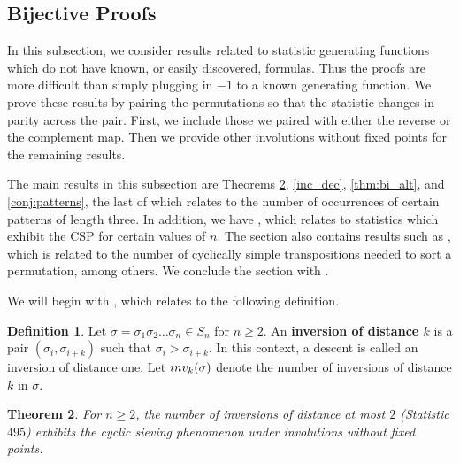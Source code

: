 \documentclass{amsart}
\newtheorem{thm}{Theorem}[section]
\theoremstyle{definition}
\newtheorem{definition}[thm]{Definition}
\newcommand{\inv}{\textnormal{inv}}
\begin{document}
\subsection{Bijective Proofs}
In this subsection, we consider results related to statistic generating functions which do not have known, or easily discovered, formulas. Thus the proofs are more difficult than simply plugging in $-1$ to a known generating function. We prove these results by pairing the permutations so that the statistic changes in parity across the pair. First, we include those we paired with either the reverse or the complement map. Then we provide other involutions without fixed points for the remaining results.

The main results in this subsection are Theorems \ref{inv_at_most_2}, \ref{inc_dec}, \ref{thm:bi_alt}, and \ref{conj:patterns}, the last of which relates to the number of occurrences of certain patterns of length three. In addition, we have , which relates to statistics which exhibit the CSP for certain values of $n$. The section also contains results such as , which is related to the number of cyclically simple transpositions needed to sort a permutation, among others. We conclude the section with .

We will begin with , which relates to the following definition.

\begin{definition}\label{def:inv_k}
  Let $\sigma=\sigma_1 \sigma_2\ldots \sigma_n \in S_n$ for $n\geq 2$. An \textbf{inversion of distance $k$} is a pair $(\sigma_i, \sigma_{i+k})$ such that $\sigma_i>\sigma_{i+k}$. In this context, a descent is called an inversion of distance one.
  Let $\inv_k(\sigma)$ denote the number of inversions of distance $k$ in $\sigma$.
\end{definition}


\begin{thm}\label{inv_at_most_2}
  For $n \geq 2$, the number of inversions of distance at most $2$ (Statistic $495$) exhibits the cyclic sieving phenomenon under involutions without fixed points.
\end{thm}
\end{document}
